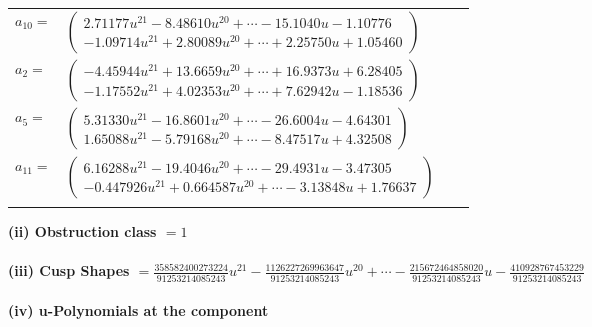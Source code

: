 \documentclass[1p]{elsarticle_modified}
\theoremstyle{definition}
\begin{document}
\begin{tabular}{m{7pt} m{180pt} m{7pt} m{180pt} }
\flushright $a_{10}=$&$\begin{pmatrix}2.71177 u^{21}-8.48610 u^{20}+\cdots-15.1040 u-1.10776\\-1.09714 u^{21}+2.80089 u^{20}+\cdots+2.25750 u+1.05460\end{pmatrix}$ \\
\flushright $a_{2}=$&$\begin{pmatrix}-4.45944 u^{21}+13.6659 u^{20}+\cdots+16.9373 u+6.28405\\-1.17552 u^{21}+4.02353 u^{20}+\cdots+7.62942 u-1.18536\end{pmatrix}$ \\
\flushright $a_{5}=$&$\begin{pmatrix}5.31330 u^{21}-16.8601 u^{20}+\cdots-26.6004 u-4.64301\\1.65088 u^{21}-5.79168 u^{20}+\cdots-8.47517 u+4.32508\end{pmatrix}$ \\
\flushright $a_{11}=$&$\begin{pmatrix}6.16288 u^{21}-19.4046 u^{20}+\cdots-29.4931 u-3.47305\\-0.447926 u^{21}+0.664587 u^{20}+\cdots-3.13848 u+1.76637\end{pmatrix}$\\&\end{tabular}
\flushleft \textbf{(ii) Obstruction class $= 1$}\\~\\
\flushleft \textbf{(iii) Cusp Shapes $= \frac{358582400273224}{91253214085243} u^{21}-\frac{1126227269963647}{91253214085243} u^{20}+\cdots-\frac{215672464858020}{91253214085243} u-\frac{410928767453229}{91253214085243}$}\\~\\
\newpage\renewcommand{\arraystretch}{1}
\flushleft \textbf{(iv) u-Polynomials at the component}\newline \\
\end{document}
